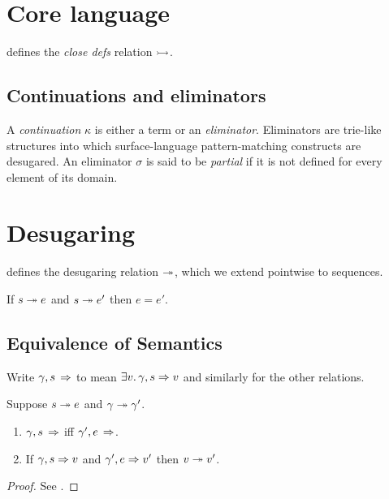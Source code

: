 \section{Core language}
\label{sec:baseline}

\begin{definition}
   \label{def:baseline:core:close-defs}
    defines the \emph{close defs} relation $\rightarrowtail$.
\end{definition}

\subsection{Continuations and eliminators}

A \emph{continuation} $\kappa$ is either a term or an \textit{eliminator}. Eliminators are trie-like
structures into which surface-language pattern-matching constructs are desugared. An eliminator $\sigma$ is
said to be \textit{partial} if it is not defined for every element of its domain.





\clearpage
\section{Desugaring}



 defines the desugaring relation $\twoheadrightarrow$, which we extend pointwise to sequences.

\begin{lemma}
   \label{lem:baseline:desugar:determinism}
   If $s \twoheadrightarrow e$ and $s \twoheadrightarrow e'$ then $e = e'$.
\end{lemma}

\subsection{Equivalence of Semantics}

Write $\gamma, s\,\Rightarrow$ to mean $\exists v.\,\gamma, s \Rightarrow v$ and similarly for the other
relations.

\begin{theorem}
   \label{thm:semantics-eq}
   Suppose $s \twoheadrightarrow e$ and $\gamma \twoheadrightarrow \gamma'$.
   \begin{enumerate}
      \item $\gamma, s\,\Rightarrow$ iff $\gamma', e\,\Rightarrow$.
      \item If $\gamma, s \Rightarrow v$ and $\gamma',e \Rightarrow v'$ then $v \twoheadrightarrow v'$.
   \end{enumerate}
\end{theorem}
\begin{proof}
   See .
\end{proof}

